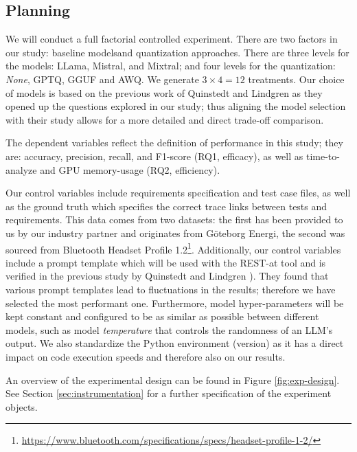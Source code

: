 \documentclass[conference]{IEEEtran}
\begin{document}
\subsection{Planning}

We will conduct a full factorial controlled experiment. There are two factors in our study: baseline models and quantization approaches. There are three levels for the models: LLama, Mistral, and Mixtral; and four levels for the quantization: \textit{None}, GPTQ, GGUF and AWQ. We generate $3 \times 4 = 12$ treatments. Our choice of models is based on the previous work of Quinstedt and Lindgren \cite{quinstedt2024Optimizing} as they opened up the questions explored in our study; thus aligning the model selection with their study allows for a more detailed and direct trade-off comparison.

The dependent variables reflect the definition of performance in this study; they are: accuracy, precision, recall, and F1-score (RQ1, efficacy), as well as time-to-analyze and GPU memory-usage (RQ2, efficiency).

Our control variables include requirements specification and test case files, as well as the ground truth which specifies the correct trace links between tests and requirements. This data comes from two datasets: the first has been provided to us by our industry partner and originates from G\"oteborg Energi, the second was sourced from Bluetooth Headset Profile 1.2\footnote{\url{https://www.bluetooth.com/specifications/specs/headset-profile-1-2/}}. Additionally, our control variables include a prompt template which will be used with the REST-at tool and is verified in the previous study by Quinstedt and Lindgren \cite{quinstedt2024Optimizing}). They found that various prompt templates lead to fluctuations in the results; therefore we have selected the most performant one. Furthermore, model hyper-parameters will be kept constant and configured to be as similar as possible between different models, such as model \textit{temperature} that controls the randomness of an LLM's output. We also standardize the Python environment (version) as it has a direct impact on code execution speeds and therefore also on our results.

An overview of the experimental design can be found in Figure \ref{fig:exp-design}. See Section \ref{sec:instrumentation} for a further specification of the experiment objects.

\end{document}
